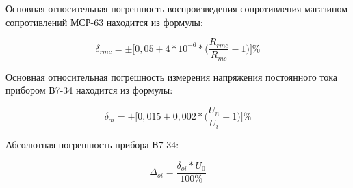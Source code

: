 Основная относительная погрешность воспроизведения сопротивления магазином сопротивлений МСР-63 находится из формулы:

\begin{equation}
  \label{eq:equation6}
  \delta_{rmc} = \pm \Big[ 0,05 + 4*10^{-6}*\big( \dfrac{R_{rmc}}{R_{mc}} - 1 \big) \Big]\%
\end{equation}

Основная относительная погрешность измерения напряжения постоянного тока прибором В7-34 находится из формулы:

\begin{equation}
  \label{eq:equation7}
  \delta_{oi} = \pm \Big[ 0,015 + 0,002*\big( \dfrac{U_{n}}{U_{i}} - 1 \big) \Big]\%
\end{equation}

Абсолютная погрешность прибора В7-34:

\begin{equation}
  \label{eq:equation8}
  \Delta_{oi} = \dfrac{\delta_{oi}*U_{0}}{100\%}
\end{equation}

\clearpage
